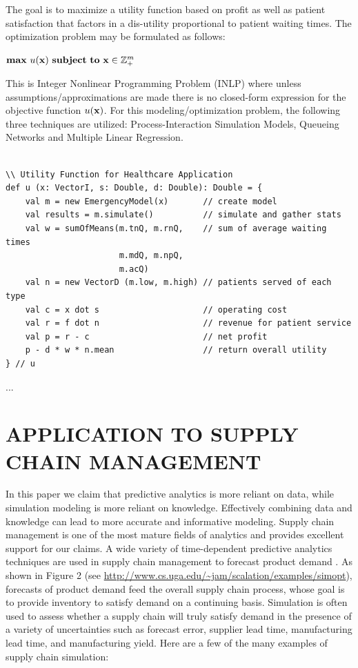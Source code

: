 \documentclass{wscpaperproc}
\theoremstyle{wsc}
\begin{document}
\noindent
The goal is to maximize a utility function based on profit as well as patient satisfaction
that factors in a dis-utility proportional to patient waiting times.
The optimization problem may be formulated as follows:

\begin{center}
${\rm \bf max} ~ u({\bf x}) ~ {\rm \bf subject ~ to} ~ {\bf x} \in {\mathbb Z}_+^m$
\end{center}

\noindent
This is Integer Nonlinear Programming Problem (INLP) where unless assumptions/approximations
are made there is no closed-form expression for the objective function $u({\bf x})$.
For this modeling/optimization problem, the following three techniques are utilized:
Process-Interaction Simulation Models, Queueing Networks and Multiple Linear Regression.

\begin{small}
\begin{verbatim}

\\ Utility Function for Healthcare Application
def u (x: VectorI, s: Double, d: Double): Double = {
    val m = new EmergencyModel(x)       // create model
    val results = m.simulate()          // simulate and gather stats
    val w = sumOfMeans(m.tnQ, m.rnQ,    // sum of average waiting times
                       m.mdQ, m.npQ,
                       m.acQ)
    val n = new VectorD (m.low, m.high) // patients served of each type
    val c = x dot s                     // operating cost
    val r = f dot n                     // revenue for patient service
    val p = r - c                       // net profit
    p - d * w * n.mean                  // return overall utility
} // u

\end{verbatim}
\end{small}

...

\section{APPLICATION TO SUPPLY CHAIN MANAGEMENT}

In this paper we claim that predictive analytics is more reliant on data, while simulation modeling is more reliant on knowledge.
Effectively combining data and knowledge can lead to more accurate and informative modeling.
Supply chain management is one of the most mature fields of analytics and provides excellent support for our claims.
A wide variety of time-dependent predictive analytics techniques are used in supply chain management to
forecast product demand .
As shown in Figure 2 (see \url{http://www.cs.uga.edu/~jam/scalation/examples/simopt}), forecasts of product demand feed the overall supply chain process, whose goal is to provide inventory to satisfy demand on a continuing basis.
Simulation is often used to assess whether a supply chain will truly satisfy demand in the presence of a variety of uncertainties such as forecast error, supplier lead time, manufacturing lead time, and manufacturing yield.
Here are a few of the many examples of supply chain simulation:
\end{document}
